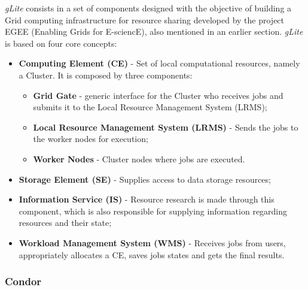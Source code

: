 \textit{gLite} consists in a set of components designed with the objective of building a Grid computing infrastructure for resource sharing developed by the project EGEE (Enabling Grids for E-sciencE), also mentioned in an earlier section.
\textit{gLite} is based on four core concepts:
\begin{itemize}
\item \textbf{Computing Element (CE)} - Set of local computational resources, namely a Cluster. It is composed by three components:
	\begin{itemize}
	\item \textbf{Grid Gate} - generic interface for the Cluster who receives jobs and submits it to the Local Resource Management System (LRMS);
	\item \textbf{Local Resource Management System (LRMS)} - Sends the jobs to the worker nodes for execution;
	\item \textbf{Worker Nodes} - Cluster nodes where jobs are executed.
	\end{itemize}
\item \textbf{Storage Element (SE)} - Supplies access to data storage resources;
\item \textbf{Information Service (IS)} - Resource research is made through this component, which is also responsible for supplying information regarding resources and their state;
\item \textbf{Workload Management System (WMS)} - Receives jobs from users, appropriately allocates a CE, saves jobs states and gets the final results.\cite{jorge-ruao,glite}
\end{itemize}

\subsubsection{Condor}\label{condor}

